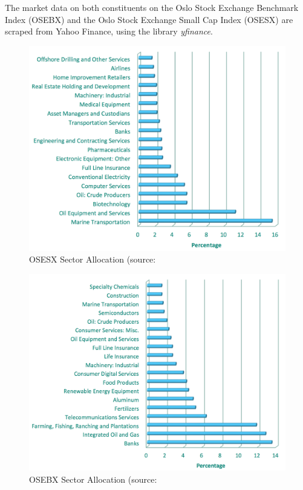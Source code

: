 The market data on both constituents on the Oslo Stock Exchange Benchmark Index (OSEBX) and the Oslo Stock Exchange Small Cap Index (OSESX) are scraped from Yahoo Finance, using the library \textit{yfinance}. 

\indent\newline 
\begin{figure}[H]
\centering
\includegraphics [scale=0.44,angle=360]{figures/smallsector.png}
\caption{OSESX Sector Allocation (source: \cite{euronext}}
\label{fig:smallsector}
\end{figure}

\indent\newline 
\begin{figure}[H]
\centering
\includegraphics [scale=0.44,angle=360]{figures/largesector.png}
\caption{OSEBX Sector Allocation (source: \cite{bors}}
\label{fig:largesector}
\end{figure}


